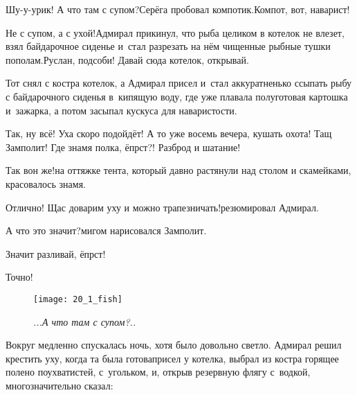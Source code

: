\diagdash Шу-у-урик! А что там с супом?\mdash Серёга пробовал компотик.\mdash Компот, вот, наварист!

\diagdash Не с супом, а с ухой!\mdash Адмирал прикинул, что рыба целиком в котелок не влезет, взял байдарочное сиденье и~стал разрезать на нём чищенные рыбные тушки пополам.\mdash Руслан, подсоби! Давай сюда котелок, открывай.

Тот снял с костра котелок, а Адмирал присел и~стал аккуратненько ссыпать рыбу с байдарочного сиденья в~кипящую воду, где уже плавала полуготовая картошка и~зажарка, а потом засыпал кус\sdash куса для наваристости.

\diagdash Так, ну всё! Уха скоро подойдёт! А то уже восемь вечера, кушать охота! Тащ Замполит! Где знамя полка, ёпрст?! Разброд и шатание! 


\diagdash Так вон же!\mdash на оттяжке тента, который давно растянули над столом и скамейками, красовалось знамя.

\diagdash Отлично! Щас доварим уху и можно трапезничать!\mdash резюмировал Адмирал.

\diagdash А что это значит?\mdash мигом нарисовался Замполит.

\diagdash Значит разливай, ёпрст!

\diagdash Точно!

\newpage
\begin{figure}[h]
	\centering
	\texttt{[image: 20\_1\_fish]}
	\caption{\small\textit{...А что там с супом?..}}
\end{figure}

Вокруг медленно спускалась ночь, хотя было довольно светло. Адмирал решил крестить уху, когда та была готова\mdash присел у котелка, выбрал из костра горящее полено поухватистей, с~угольком, и, открыв резервную флягу с~водкой, многозначительно сказал:

